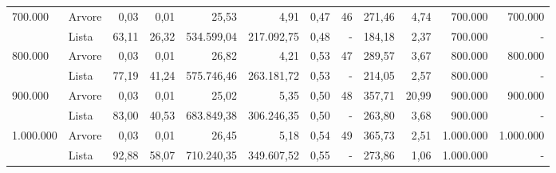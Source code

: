 \begin{table}
\begin{tabular}{llrrrrrrrrrr}
\cline{1-12}
\multirow[c]{2}{*}{700.000} & Arvore & 0,03 & 0,01 & 25,53 & 4,91 & 0,47 & 46 & 271,46 & 4,74 & 700.000 & 700.000 \\
 & Lista & 63,11 & 26,32 & 534.599,04 & 217.092,75 & 0,48 & - & 184,18 & 2,37 & 700.000 & - \\
\cline{1-12}
\multirow[c]{2}{*}{800.000} & Arvore & 0,03 & 0,01 & 26,82 & 4,21 & 0,53 & 47 & 289,57 & 3,67 & 800.000 & 800.000 \\
 & Lista & 77,19 & 41,24 & 575.746,46 & 263.181,72 & 0,53 & - & 214,05 & 2,57 & 800.000 & - \\
\cline{1-12}
\multirow[c]{2}{*}{900.000} & Arvore & 0,03 & 0,01 & 25,02 & 5,35 & 0,50 & 48 & 357,71 & 20,99 & 900.000 & 900.000 \\
 & Lista & 83,00 & 40,53 & 683.849,38 & 306.246,35 & 0,50 & - & 263,80 & 3,68 & 900.000 & - \\
\cline{1-12}
\multirow[c]{2}{*}{1.000.000} & Arvore & 0,03 & 0,01 & 26,45 & 5,18 & 0,54 & 49 & 365,73 & 2,51 & 1.000.000 & 1.000.000 \\
 & Lista & 92,88 & 58,07 & 710.240,35 & 349.607,52 & 0,55 & - & 273,86 & 1,06 & 1.000.000 & - \\
\cline{1-12}
\bottomrule
\end{tabular}
\end{table}

